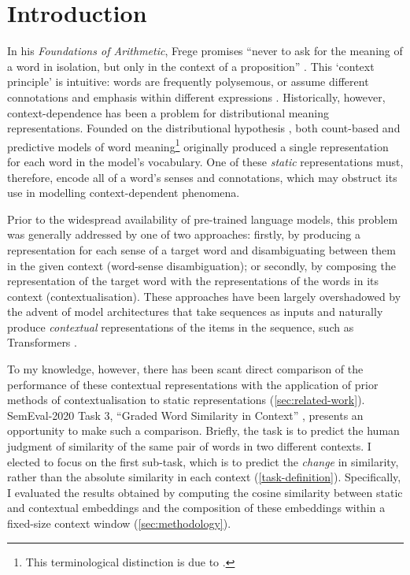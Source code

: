 \section{Introduction}
\label{sec:introduction}

In his \emph{Foundations of Arithmetic}, Frege promises ``never to ask for the meaning
of a word in isolation, but only in the context of a proposition''
\parencite*[xvii]{Frege1980}.
This `context principle' is intuitive: words are frequently polysemous, or assume
different connotations and emphasis within different expressions
\parencite[2-3]{Armendariz2020}.
Historically, however, context-dependence has been a problem for distributional meaning
representations.
Founded on the distributional hypothesis \parencites{Harris1954}{Firth1957}, both
count-based and predictive models of word meaning\footnote{ This terminological
  distinction is due to \textcite{Baroni2014a}.
} originally
produced a single representation for each word in the model's vocabulary.
One of these \emph{static} representations must, therefore, encode all of a word's
senses and connotations, which may obstruct its use in modelling context-dependent
phenomena.

Prior to the widespread availability of pre-trained language models, this problem was
generally addressed by one of two approaches: firstly, by producing a representation
for each sense of a target word and disambiguating between them in the given context
(word-sense disambiguation); or secondly, by composing the representation of the target
word with the representations of the words in its context (contextualisation).
These approaches have been largely overshadowed by the advent of model architectures
that take sequences as inputs and naturally produce \emph{contextual} representations
of the items in the sequence, such as Transformers \parencite{Vaswani2017}.

To my knowledge, however, there has been scant direct comparison of the performance of
these contextual representations with the application of prior methods of
contextualisation to static representations (\cref{sec:related-work}).
SemEval-2020 Task 3, ``Graded Word Similarity in Context'' \parencite{Armendariz2020a},
presents an opportunity to make such a comparison.
Briefly, the task is to predict the human judgment of similarity of the same pair of
words in two different contexts.
I elected to focus on the first sub-task, which is to predict the \emph{change} in
similarity, rather than the absolute similarity in each context
(\cref{task-definition}).
Specifically, I evaluated the results obtained by computing the cosine similarity
between static and contextual embeddings and the composition of these embeddings within
a fixed-size context window (\cref{sec:methodology}).
